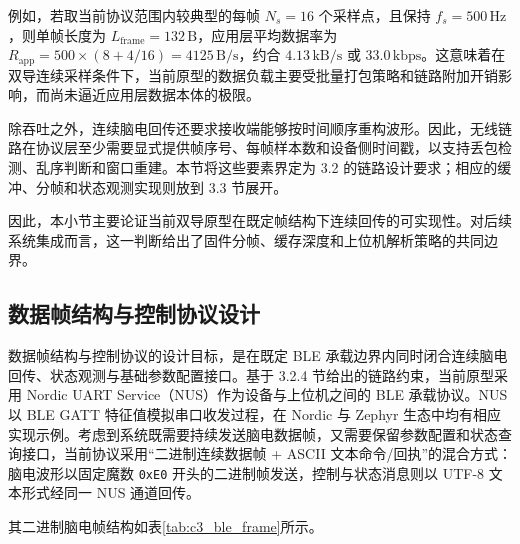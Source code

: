 例如，若取当前协议范围内较典型的每帧 $N_s=16$ 个采样点，且保持 $f_s=500\,\mathrm{Hz}$，则单帧长度为 $L_{\mathrm{frame}}=132\,\mathrm{B}$，应用层平均数据率为 $R_{\mathrm{app}}=500\times(8+4/16)=4125\,\mathrm{B/s}$，约合 $4.13\,\mathrm{kB/s}$ 或 $33.0\,\mathrm{kbps}$。这意味着在双导连续采样条件下，当前原型的数据负载主要受批量打包策略和链路附加开销影响，而尚未逼近应用层数据本体的极限。

除吞吐之外，连续脑电回传还要求接收端能够按时间顺序重构波形。因此，无线链路在协议层至少需要显式提供帧序号、每帧样本数和设备侧时间戳，以支持丢包检测、乱序判断和窗口重建。本节将这些要素界定为 3.2 的链路设计要求；相应的缓冲、分帧和状态观测实现则放到 3.3 节展开。

因此，本小节主要论证当前双导原型在既定帧结构下连续回传的可实现性。对后续系统集成而言，这一判断给出了固件分帧、缓存深度和上位机解析策略的共同边界。

\subsection{数据帧结构与控制协议设计}

数据帧结构与控制协议的设计目标，是在既定 BLE 承载边界内同时闭合连续脑电回传、状态观测与基础参数配置接口。基于 3.2.4 节给出的链路约束，当前原型采用 Nordic UART Service（NUS）作为设备与上位机之间的 BLE 承载协议。NUS 以 BLE GATT 特征值模拟串口收发过程，在 Nordic 与 Zephyr 生态中均有相应实现示例\cite{nordic_nus,zephyr_peripheral_nus}。考虑到系统既需要持续发送脑电数据帧，又需要保留参数配置和状态查询接口，当前协议采用“二进制连续数据帧 + ASCII 文本命令/回执”的混合方式：脑电波形以固定魔数 \texttt{0xE0} 开头的二进制帧发送，控制与状态消息则以 UTF-8 文本形式经同一 NUS 通道回传。

其二进制脑电帧结构如表\ref{tab:c3_ble_frame}所示。

